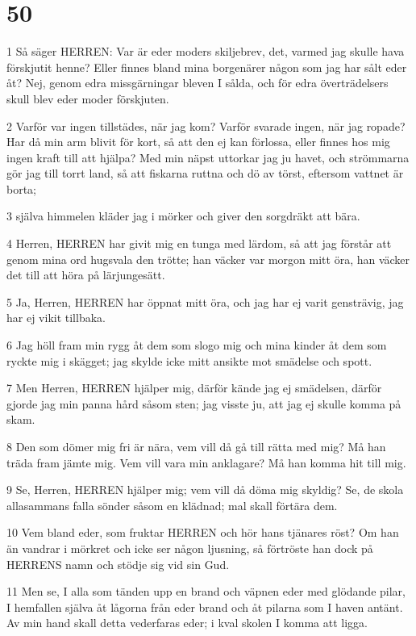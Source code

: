 \chapter{50}

\par 1 Så säger HERREN: Var är eder moders skiljebrev, det, varmed jag skulle hava förskjutit henne? Eller finnes bland mina borgenärer någon som jag har sålt eder åt? Nej, genom edra missgärningar bleven I sålda, och för edra överträdelsers skull blev eder moder förskjuten.
\par 2 Varför var ingen tillstädes, när jag kom? Varför svarade ingen, när jag ropade? Har då min arm blivit för kort, så att den ej kan förlossa, eller finnes hos mig ingen kraft till att hjälpa? Med min näpst uttorkar jag ju havet, och strömmarna gör jag till torrt land, så att fiskarna ruttna och dö av törst, eftersom vattnet är borta;
\par 3 själva himmelen kläder jag i mörker och giver den sorgdräkt att bära.
\par 4 Herren, HERREN har givit mig en tunga med lärdom, så att jag förstår att genom mina ord hugsvala den trötte; han väcker var morgon mitt öra, han väcker det till att höra på lärjungesätt.
\par 5 Ja, Herren, HERREN har öppnat mitt öra, och jag har ej varit gensträvig, jag har ej vikit tillbaka.
\par 6 Jag höll fram min rygg åt dem som slogo mig och mina kinder åt dem som ryckte mig i skägget; jag skylde icke mitt ansikte mot smädelse och spott.
\par 7 Men Herren, HERREN hjälper mig, därför kände jag ej smädelsen, därför gjorde jag min panna hård såsom sten; jag visste ju, att jag ej skulle komma på skam.
\par 8 Den som dömer mig fri är nära, vem vill då gå till rätta med mig? Må han träda fram jämte mig. Vem vill vara min anklagare? Må han komma hit till mig.
\par 9 Se, Herren, HERREN hjälper mig; vem vill då döma mig skyldig? Se, de skola allasammans falla sönder såsom en klädnad; mal skall förtära dem.
\par 10 Vem bland eder, som fruktar HERREN och hör hans tjänares röst? Om han än vandrar i mörkret och icke ser någon ljusning, så förtröste han dock på HERRENS namn och stödje sig vid sin Gud.
\par 11 Men se, I alla som tänden upp en brand och väpnen eder med glödande pilar, I hemfallen själva åt lågorna från eder brand och åt pilarna som I haven antänt. Av min hand skall detta vederfaras eder; i kval skolen I komma att ligga.


